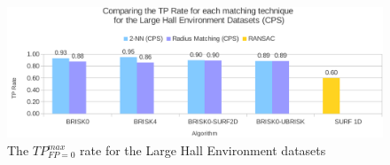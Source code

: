\documentclass[11pt]{report}
\begin{document}
\begin{figure}
  \centering
    \includegraphics[width=1.0\textwidth]{../Drawings/Graphs/tp_rate_lh_cps.pdf}
    \caption{The $TP_{FP=0}^{max}$ rate for the Large Hall Environment datasets} 
    \label{app:tp_rate_lh}
\end{figure}

%
 
\end{document}
